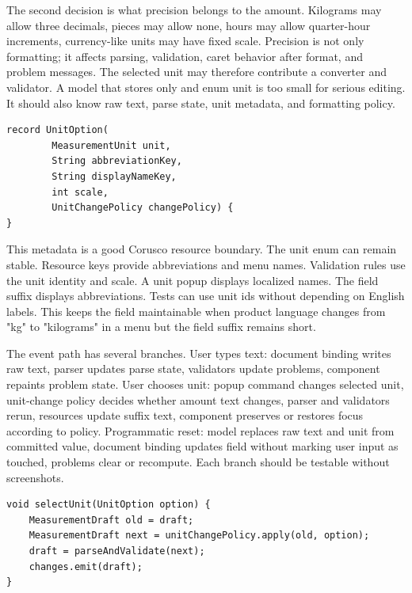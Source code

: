 The second decision is what precision belongs to the amount. Kilograms may allow three
decimals, pieces may allow none, hours may allow quarter-hour increments, currency-like
units may have fixed scale. Precision is not only formatting; it affects parsing,
validation, caret behavior after format, and problem messages. The selected unit may
therefore contribute a converter and validator. A model that stores only
 and enum unit is too
small for serious editing. It should also know raw text, parse state, unit metadata, and
formatting policy.

\begin{lstlisting}[caption={Unit metadata makes conversion and formatting explicit.}]
record UnitOption(
        MeasurementUnit unit,
        String abbreviationKey,
        String displayNameKey,
        int scale,
        UnitChangePolicy changePolicy) {
}
\end{lstlisting}

This metadata is a good Corusco resource boundary. The unit enum can remain stable.
Resource keys provide abbreviations and menu names. Validation rules use the unit
identity and scale. A unit popup displays localized names. The field suffix displays
abbreviations. Tests can use unit ids without depending on English labels. This keeps
the field maintainable when product language changes from "kg" to "kilograms" in a menu
but the field suffix remains short.

The event path has several branches. User types text: document binding writes raw text,
parser updates parse state, validators update problems, component repaints problem
state. User chooses unit: popup command changes selected unit, unit-change policy
decides whether amount text changes, parser and validators rerun, resources update
suffix text, component preserves or restores focus according to policy. Programmatic
reset: model replaces raw text and unit from committed value, document binding updates
field without marking user input as touched, problems clear or recompute. Each branch
should be testable without screenshots.

\begin{lstlisting}[caption={A unit change event is model work before Swing refresh.}]
void selectUnit(UnitOption option) {
    MeasurementDraft old = draft;
    MeasurementDraft next = unitChangePolicy.apply(old, option);
    draft = parseAndValidate(next);
    changes.emit(draft);
}
\end{lstlisting}

